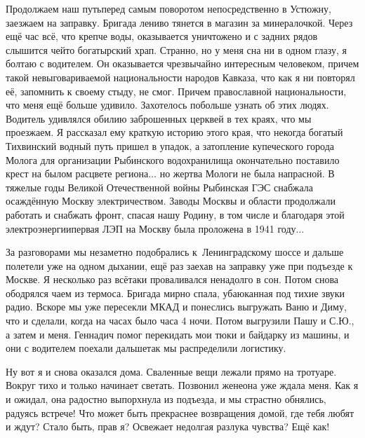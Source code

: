 Продолжаем наш путь\mdash перед самым поворотом непосредственно в Устюжну, заезжаем на заправку. Бригада лениво тянется в магазин за минералочкой. Через ещё час всё, что крепче воды, оказывается уничтожено и с задних рядов слышится чей\sdash то богатырский храп. Странно, но у меня сна ни в одном глазу, я болтаю с водителем. Он оказывается чрезвычайно интересным человеком, причем такой невыговариваемой национальности народов Кавказа, что как я ни повторял её, запомнить к своему стыду, не смог. Причем православной национальности, что меня ещё больше удивило. Захотелось побольше узнать об этих людях. Водитель удивлялся обилию заброшенных церквей в тех краях, что мы проезжаем. Я рассказал ему краткую историю этого края, что некогда богатый Тихвинский водный путь пришел в упадок, а затопление купеческого города Молога для организации Рыбинского водохранилища окончательно поставило крест на былом расцвете региона$\ldots$ но жертва Мологи не была напрасной. В тяжелые годы Великой Отечественной войны Рыбинская ГЭС снабжала осаждённую Москву электричеством. Заводы Москвы и области продолжали работать и снабжать фронт, спасая нашу Родину, в том числе и благодаря этой электроэнергии\mdash первая ЛЭП на Москву была проложена в 1941 году$\ldots$ 

За разговорами мы незаметно подобрались к~Ленинградскому шоссе и дальше полетели уже на одном дыхании, ещё раз заехав на заправку уже при подъезде к Москве. Я несколько раз всё\sdash таки проваливался ненадолго в сон. Потом снова ободрялся чаем из термоса. Бригада мирно спала, убаюканная под тихие звуки радио. Вскоре мы уже пересекли МКАД и понеслись выгружать Ваню и Диму, что и сделали, когда на часах было часа 4 ночи. Потом выгрузили Пашу и С.Ю., а затем и меня. Геннадич помог перекидать мои тюки и байдарку из машины, и они с водителем поехали дальше\mdash так мы распределили логистику. 

Ну вот я и снова оказался дома. Сваленные вещи лежали прямо на тротуаре. Вокруг тихо и только начинает светать. Позвонил жене\mdash она уже ждала меня. Как я и ожидал, она радостно выпорхнула из подъезда, и мы страстно обнялись, радуясь встрече! Что может быть прекраснее возвращения домой, где тебя любят и ждут? Стало быть, прав я? Освежает недолгая разлука чувства? Ещё как! 

\begin{center}
\end{center}
